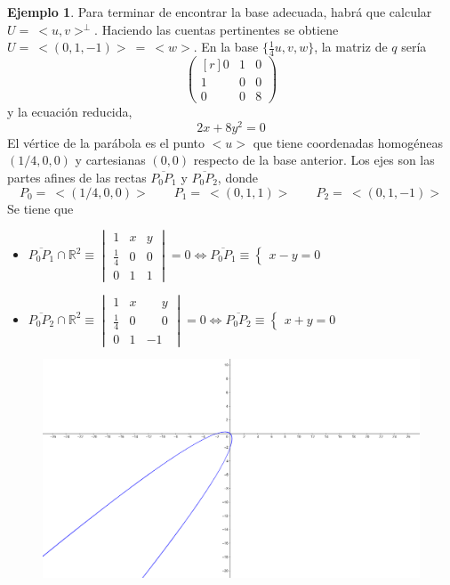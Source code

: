 \documentclass[12pt]{report}
\theoremstyle{definition}
\theoremstyle{definition}
\newtheorem{example}{Ejemplo}[chapter]
\theoremstyle{remark}
\newcommand{\R}{\mathbb R}
\begin{document}
\begin{example}
\vspace{3mm}
\noindent Para terminar de encontrar la base adecuada, habrá que calcular $U = \ <u,v>^\perp$. Haciendo las cuentas pertinentes se obtiene $U= \ <(0,1,-1)> \ = \ <w>$. En la base $\{\frac{1}{4}u,v,w\}$, la matriz de $q$ sería
\[\begin{pmatrix*}[r]
    0 & 1 & 0 \\
    1 & 0 & 0 \\
    0 & 0 & 8
\end{pmatrix*}\]
y la ecuación reducida,
\[2x+8y^2 = 0\]
El vértice de la parábola es el punto $<u>$ que tiene coordenadas homogéneas $(1/4,0,0)$ y cartesianas $(0,0)$ respecto de la base anterior. Los ejes son las partes afines de las rectas $\overline{P_0P_1}$ y $\overline{P_0P_2}$, donde \[P_0 = \ <(1/4,0,0)> \qquad P_1 = \ <(0,1,1)> \qquad P_2 = \ <(0,1,-1)>\]
Se tiene que
\begin{itemize}
    \item $\displaystyle \overline{P_0P_1} \cap \R^2 \equiv \begin{vmatrix}
        1 & x & y \\[2pt]
         \frac{1}{4} & 0 & 0 \\[2pt]
        0 & 1 & 1
    \end{vmatrix} = 0 \iff \overline{P_0P_1} \equiv \begin{cases}
        x-y = 0
    \end{cases}$
    \item $\displaystyle \overline{P_0P_2} \cap \R^2 \equiv \begin{vmatrix}
        1 & x & \phantom{-}y \\[2pt]
        \frac{1}{4} & 0 & \phantom{-}0 \\[2pt]
        0 & 1 & -1
    \end{vmatrix} = 0 \iff \overline{P_0P_2} \equiv \begin{cases}
        x+y = 0
    \end{cases}$
\end{itemize}

\begin{figure}[h]
\includegraphics[scale = 0.3]{6.3_3}
\centering
\end{figure}

\end{example}
\end{document}
